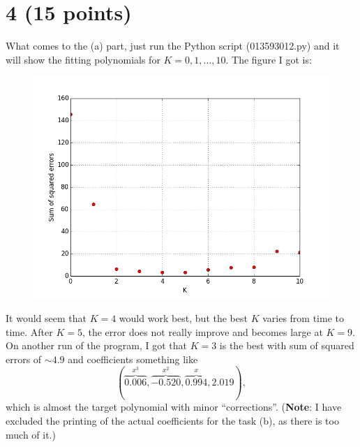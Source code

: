 \documentclass[10pt]{article}
\begin{document}
\section*{4 (15 points)}
What comes to the (a) part, just run the Python script (013593012.py) and it will show the fitting polynomials for $K = 0, 1, \dots, 10$. The figure I got is:
\begin{figure}[H]
\begin{center}
\includegraphics[scale=0.7]{CrossValidation}
\end{center}
\end{figure}
It would seem that $K = 4$ would work best, but the best $K$ varies from time to time. After $K = 5$, the error does not really improve and becomes large at $K = 9$. On another run of the program, I got that $K = 3$ is the best with sum of squared errors of $\sim 4.9$ and coefficients something like 
\[
(\overbrace{0.006}^{x^3}, \overbrace{-0.520}^{x^2}, \overbrace{0.994}^{x}, 2.019),
\] 
which is almost the target polynomial with minor ``corrections''. (\textbf{Note}: I have excluded the printing of the actual coefficients for the task (b), as there is too much of it.)
\end{document}
